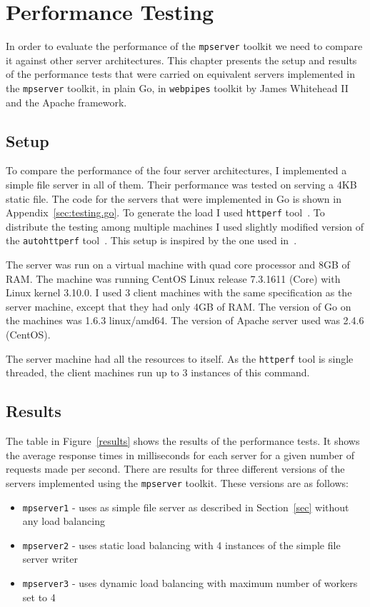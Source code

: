 \section{Performance Testing}
\label{sec:test}
In order to evaluate the performance of the \texttt{mpserver} toolkit we 
need to compare it against other server architectures.
This chapter presents the setup and results of the performance tests
that were carried on equivalent servers implemented in the \texttt{mpserver} toolkit,
in plain Go, in \texttt{webpipes} toolkit by James Whitehead II~\cite{whitehead} 
and the Apache framework.

\subsection{Setup}
To compare the performance of the four server architectures, I 
implemented a simple file server in all of them. Their performance 
was tested on serving a 4KB static file. The code for the servers 
that were implemented in Go is shown in Appendix~\ref{sec:testing.go}. To generate 
the load I used \texttt{httperf} tool~\cite{httperf}. To distribute 
the testing among multiple machines I used slightly modified version
of the \texttt{autohttperf} tool~\cite{whitehead}.
This setup is inspired by the one used in~\cite{whitehead}.

The server was run on a virtual machine with quad core processor and 
8GB of RAM. The machine was running CentOS Linux release 7.3.1611 (Core)
with Linux kernel 3.10.0.
I used 3 client machines with the same specification as the server machine, 
except that they had only 4GB of RAM. The version of Go on the machines was
1.6.3 linux/amd64. The version of Apache server used was 2.4.6 (CentOS).

The server machine had all the resources to itself. As the \texttt{httperf}
tool is single threaded, the client machines run up to 3 instances
of this command.

\subsection{Results}
The table in Figure~\ref{results} shows the results of the performance tests.
It shows the average response times in milliseconds for each server for
a given number of requests made per second. There are results for
three different versions of the servers implemented using the \texttt{mpserver}
toolkit. These versions are as follows:
\begin{itemize}
	\item \texttt{mpserver1} - uses as simple file server as 
		  described in Section~\ref{sec} without any load balancing

	\item \texttt{mpserver2} - uses static load balancing with 4 instances
		  of the simple file server writer

	\item \texttt{mpserver3} - uses dynamic load balancing with maximum number of 
		  workers set to 4
\end{itemize}

